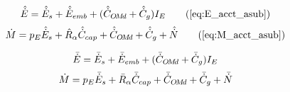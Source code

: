 

\begin{landscape}

\linespread{1}


\sectionsep{}

{
\begin{equation}
  \Eacctbinc{} \tag{\ref{eq:E_acct_asub}}
\end{equation}
}
{
\begin{equation}
  \Macctbinc{} \tag{\ref{eq:M_acct_asub}}
\end{equation}
}

\sectionsep{}

{
\begin{equation} \label{eq:E_acct_ainc}
\bar{\dot{E}} = \bar{\dot{E}}_s + \bar{\dot{E}}_{emb} + (\bar{\dot{C}}_{O\!M\!d} + \bar{\dot{C}}_g) I_E{}
\end{equation}
}
{
\begin{equation} \label{eq:M_acct_ainc}
\dot{M} = p_E \bar{\dot{E}}_s + \bar{R}_\alpha \bar{\dot{C}}_{cap} + \bar{\dot{C}}_{O\!M\!d} + \bar{\dot{C}}_g + \bar{\dot{N}}{}
\end{equation}
}

\sectionsep{}

\derivsection{}
{
~

}
\end{landscape}
